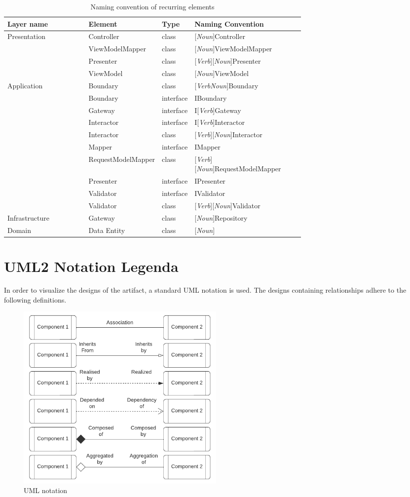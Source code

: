 \begin{table}[H]
  \footnotesize
  \begin{tabular}{ l p{0.24\linewidth} p{0.09\linewidth} p{0.37\linewidth} }
  \hline
  \textbf{Layer name} & \textbf{Element} & \textbf{Type} & \textbf{Naming Convention} \\ \hline
  Presentation & Controller & class & [\textit{Noun}]Controller \\
  & ViewModelMapper & class & [\textit{Noun}]ViewModelMapper \\
  & Presenter & class & [\textit{Verb}][\textit{Noun}]Presenter \\
  & ViewModel & class & [\textit{Noun}]ViewModel \\

  Application & Boundary & class & [\textit{VerbNoun}]Boundary \\
  & Boundary  & interface & IBoundary \\
  & Gateway  & interface & I[\textit{Verb}]Gateway \\
  & Interactor  & interface & I[\textit{Verb}]Interactor \\
  & Interactor & class & [\textit{Verb}][\textit{Noun}]Interactor \\
  & Mapper  & interface & IMapper \\
  & RequestModelMapper & class & [\textit{Verb}][\textit{Noun}]RequestModelMapper \\
  & Presenter  & interface & IPresenter \\
  & Validator  & interface & IValidator \\
  & Validator & class & [\textit{Verb}][\textit{Noun}]Validator \\
  
  Infrastructure & Gateway & class & [\textit{Noun}]Repository \\

  Domain & Data Entity & class & [\textit{Noun}] \\ \hline

  \end{tabular}
  \caption{Naming convention of recurring elements}
  \label{table_element_naming_convention}
\end{table}

\section{UML2 Notation Legenda} \label{appendix_legenda} 

In order to visualize the designs of the artifact, a standard UML notation is used. The
designs containing relationships adhere to the following definitions.

\begin{figure}[H]
  \centering
  \includegraphics[width=0.5\textwidth]{figures/legenda.pdf}
  \caption[UML Notation used]{UML notation}
  \label{fi:class_diagram_relationship_notation}
\end{figure}